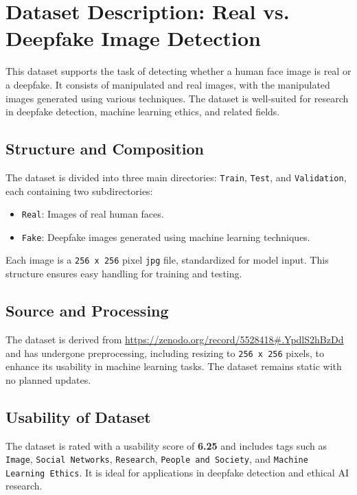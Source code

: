 \documentclass[10pt,twocolumn,letterpaper]{article}
\begin{document}
\section{Dataset Description: Real vs. Deepfake Image Detection}

This dataset supports the task of detecting whether a human face image is real or a deepfake. It consists of manipulated and real images, with the manipulated images generated using various techniques. The dataset is well-suited for research in deepfake detection, machine learning ethics, and related fields.

\subsection{Structure and Composition}

The dataset is divided into three main directories: \texttt{Train}, \texttt{Test}, and \texttt{Validation}, each containing two subdirectories:
\begin{itemize}
    \item \texttt{Real}: Images of real human faces.
    \item \texttt{Fake}: Deepfake images generated using machine learning techniques.
\end{itemize}

Each image is a \texttt{256 x 256} pixel \texttt{jpg} file, standardized for model input. This structure ensures easy handling for training and testing.

\subsection{Source and Processing}

The dataset is derived from \url{https://zenodo.org/record/5528418#.YpdlS2hBzDd} and has undergone preprocessing, including resizing to \texttt{256 x 256} pixels, to enhance its usability in machine learning tasks. The dataset remains static with no planned updates.

\subsection{Usability of Dataset}

The dataset is rated with a usability score of \textbf{6.25} and includes tags such as \texttt{Image}, \texttt{Social Networks}, \texttt{Research}, \texttt{People and Society}, and \texttt{Machine Learning Ethics}. It is ideal for applications in deepfake detection and ethical AI research.
\end{document}

